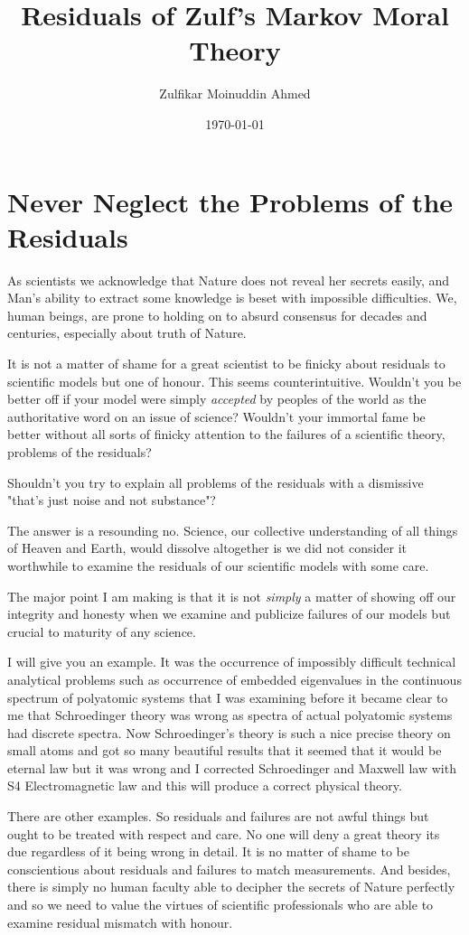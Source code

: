 \documentclass{amsart}
\title{Residuals of Zulf's Markov Moral Theory}
\author{Zulfikar Moinuddin Ahmed}
\date{\today}
\begin{document}
\maketitle

\section{Never Neglect the Problems of the Residuals}

As scientists we acknowledge that Nature does not reveal her secrets easily, and Man's ability to extract some knowledge is beset with impossible difficulties.  We, human beings, are prone to holding on to absurd consensus for decades and centuries, especially about truth of Nature.  

It is not a matter of shame for a great scientist to be finicky about residuals to scientific models but one of honour.  This seems counterintuitive.  Wouldn't you be better off if your model were simply {\em accepted} by peoples of the world as the authoritative word on an issue of science?  Wouldn't your immortal fame be better without all sorts of finicky attention to the failures of a scientific theory, problems of the residuals?  

Shouldn't you try to explain all problems of the residuals with a dismissive "that's just noise and not substance"?  

The answer is a resounding no.  Science, our collective understanding of all things of Heaven and Earth, would dissolve altogether is we did not consider it worthwhile to examine the residuals of our scientific models with some care.

The major point I am making is that it is not {\em simply} a matter of showing off our integrity and honesty when we examine and publicize failures of our models but crucial to maturity of any science.

I will give you an example.  It was the occurrence of impossibly difficult technical analytical problems such as occurrence of embedded eigenvalues in the continuous spectrum of polyatomic systems that I was examining before it became clear to me that Schroedinger theory was wrong as spectra of actual polyatomic systems had discrete spectra.  Now Schroedinger's theory is such a nice precise theory on small atoms and got so many beautiful results that it seemed that it would be eternal law but it was wrong and I corrected Schroedinger and Maxwell law with S4 Electromagnetic law and this will produce a correct physical theory.

There are other examples.  So residuals and failures are not awful things but ought to be treated with respect and care.  No one will deny a great theory its due regardless of it being wrong in detail.  It is no matter of shame to be conscientious about residuals and failures to match measurements.  And besides, there is simply no human faculty able to decipher the secrets of Nature perfectly and so we need to value the virtues of scientific professionals who are able to examine residual mismatch with honour.
\end{document}
